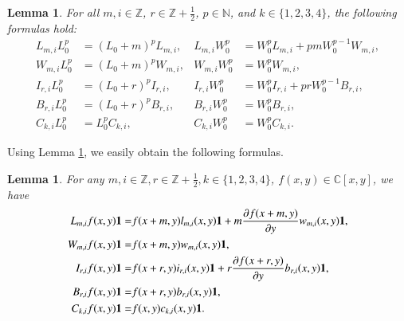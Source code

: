 \documentclass[12pt,reqno]{amsart}
\def\Z{\mathbb{Z}}
\def\C{\mathbb{C}}
\numberwithin{equation}{section}
\newtheorem{lemm}[theo]{Lemma}
\begin{document}
\begin{lemm}\label{le4.1}
    For all $m,i\in\mathbb{Z}$, $r\in\mathbb{Z}+\frac{1}{2}$, $p\in\mathbb{N}$, and $k\in\{1,2,3,4\}$, the following formulas hold:
    \begin{align*}
        L_{m,i}L_{0}^{p} &= (L_{0}+m)^{p}L_{m,i}, &
        L_{m,i}W_{0}^{p} &= W_{0}^{p}L_{m,i}+pmW_{0}^{p-1}W_{m,i},\\
        W_{m,i}L_{0}^{p} &= (L_{0}+m)^{p}W_{m,i}, &
        W_{m,i}W_{0}^{p} &= W_{0}^{p}W_{m,i},\\
        I_{r,i}L_{0}^{p} &= (L_{0}+r)^{p}I_{r,i}, &
        I_{r,i}W_{0}^{p} &= W_{0}^{p}I_{r,i}+prW_{0}^{p-1}B_{r,i},\\
        B_{r,i}L_{0}^{p} &= (L_{0}+r)^{p}B_{r,i}, &
        B_{r,i}W_{0}^{p} &= W_{0}^{p}B_{r,i},\\
        C_{k,i}L_{0}^{p} &= L_{0}^{p}C_{k,i}, &
        C_{k,i}W_{0}^{p} &= W_{0}^{p}C_{k,i}.
    \end{align*}
\end{lemm}







Using Lemma \ref{le4.1}, we easily obtain the following formulas.
\begin{lemm}\label{Lemma 4.2}
    For any $m,i\in \Z, r\in \Z+\frac{1}{2}, k\in \{1,2,3,4\}$, $f(x,y)\in \C[x,y]$, we have
\begin{equation*}\label{formula4.2.1}
\aligned
L_{m,i} f(x,y)\mathbf{1}=&f(x+m,y)l_{m,i}(x,y)\mathbf{1}+m\frac{\partial {f(x+m,y)}}{\partial {y}}w_{m,i}(x,y)\mathbf{1},\\
W_{m,i} f(x,y)\mathbf{1}=&f(x+m,y)w_{m,i}(x,y)\mathbf{1},\\
I_{r,i} f(x,y)\mathbf{1}=&f(x+r,y)i_{r,i}(x,y)\mathbf{1}+r\frac{\partial {f(x+r,y)}}{\partial {y}}b_{r,i}(x,y)\mathbf{1},\\
B_{r,i} f(x,y)\mathbf{1}=&f(x+r,y)b_{r,i}(x,y)\mathbf{1},\\
C_{k,i} f(x,y)\mathbf{1}=&f(x,y)c_{k,i}(x,y)\mathbf{1}.
\endaligned
\end{equation*}

    
\end{lemm}
\end{document}

